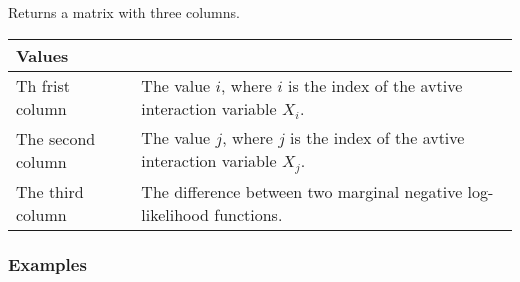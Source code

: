 \documentclass[]{article}
\begin{document}
Returns a matrix with three columns.

\begin{longtable}[]{@{}ll@{}}
\toprule
\begin{minipage}[b]{0.19\columnwidth}\raggedright\strut
Values\strut
\end{minipage} & \begin{minipage}[b]{0.75\columnwidth}\raggedright\strut
\strut
\end{minipage}\tabularnewline
\midrule
\endhead
\begin{minipage}[t]{0.19\columnwidth}\raggedright\strut
Th frist column\strut
\end{minipage} & \begin{minipage}[t]{0.75\columnwidth}\raggedright\strut
The value \(i\), where \(i\) is the index of the avtive interaction
variable \(X_i\).\strut
\end{minipage}\tabularnewline
\begin{minipage}[t]{0.19\columnwidth}\raggedright\strut
The second column\strut
\end{minipage} & \begin{minipage}[t]{0.75\columnwidth}\raggedright\strut
The value \(j\), where \(j\) is the index of the avtive interaction
variable \(X_j\).\strut
\end{minipage}\tabularnewline
\begin{minipage}[t]{0.19\columnwidth}\raggedright\strut
The third column\strut
\end{minipage} & \begin{minipage}[t]{0.75\columnwidth}\raggedright\strut
The difference between two marginal negative log-likelihood
functions.\strut
\end{minipage}\tabularnewline
\bottomrule
\end{longtable}

\subsubsection{Examples}\label{examples}
\end{document}
